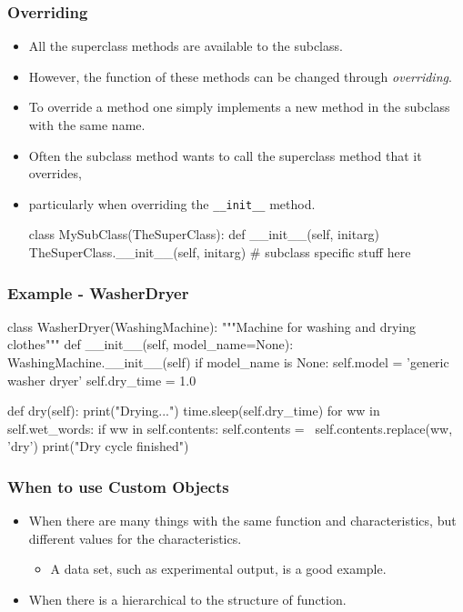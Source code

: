 \documentclass{beamer}
\begin{document}
\begin{frame}[fragile]
\frametitle{Overriding}

\begin{itemize}
\item All the superclass methods are available to the subclass.
\item However, the function of these methods can be changed through \emph{overriding}.
\item To override a method one simply implements a new method in the subclass with the same name.
\item Often the subclass method wants to call the superclass method that it overrides,
\item particularly when overriding the \lstinline|__init__| method.
\begin{code}
  class MySubClass(TheSuperClass):
    def __init__(self, initarg)
      TheSuperClass.__init__(self, initarg)
      # subclass specific stuff here
\end{code}
\end{itemize}

\end{frame}

\begin{frame}[fragile]
\frametitle{Example - WasherDryer}
\begin{code}
class WasherDryer(WashingMachine):
    """Machine for washing and drying clothes"""
    def __init__(self, model_name=None):
        WashingMachine.__init__(self)
        if model_name is None:
          self.model = 'generic washer dryer'
        self.dry_time = 1.0

    def dry(self):
        print("Drying...")
        time.sleep(self.dry_time)
        for ww in self.wet_words:
            if ww in self.contents:
                self.contents = \
                       self.contents.replace(ww, 'dry')
        print("Dry cycle finished")
        
\end{code}

\end{frame}

\begin{frame}[fragile]
\frametitle{When to use Custom Objects}
\begin{itemize}
\item When there are many things with the same function and characteristics,
but different values for the characteristics.
\begin{itemize}
\item A data set, such as experimental output, is a good example.
\end{itemize}
\item When there is a hierarchical to the structure of function.
\end{itemize}

\end{frame}
\end{document}
